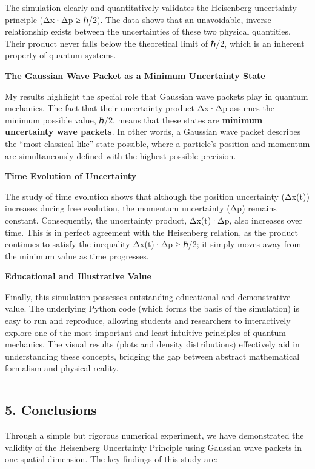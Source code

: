 \documentclass[
  11pt,
]{article}
\begin{document}
The simulation clearly and quantitatively validates the Heisenberg
uncertainty principle (Δx·Δp ≥ ℏ/2). The data shows that an unavoidable,
inverse relationship exists between the uncertainties of these two
physical quantities. Their product never falls below the theoretical
limit of ℏ/2, which is an inherent property of quantum systems.

\textbf{The Gaussian Wave Packet as a Minimum Uncertainty State}

My results highlight the special role that Gaussian wave packets play in
quantum mechanics. The fact that their uncertainty product Δx·Δp assumes
the minimum possible value, ℏ/2, means that these states are
\textbf{minimum uncertainty wave packets}. In other words, a Gaussian
wave packet describes the ``most classical-like'' state possible, where
a particle's position and momentum are simultaneously defined with the
highest possible precision.

\textbf{Time Evolution of Uncertainty}

The study of time evolution shows that although the position uncertainty
(Δx(t)) increases during free evolution, the momentum uncertainty (Δp)
remains constant. Consequently, the uncertainty product, Δx(t)·Δp, also
increases over time. This is in perfect agreement with the Heisenberg
relation, as the product continues to satisfy the inequality Δx(t)·Δp ≥
ℏ/2; it simply moves away from the minimum value as time progresses.

\textbf{Educational and Illustrative Value}

Finally, this simulation possesses outstanding educational and
demonstrative value. The underlying Python code (which forms the basis
of the simulation) is easy to run and reproduce, allowing students and
researchers to interactively explore one of the most important and least
intuitive principles of quantum mechanics. The visual results (plots and
density distributions) effectively aid in understanding these concepts,
bridging the gap between abstract mathematical formalism and physical
reality.

\begin{center}\rule{0.5\linewidth}{0.5pt}\end{center}

\subsection{5. Conclusions}\label{conclusions}

Through a simple but rigorous numerical experiment, we have demonstrated
the validity of the Heisenberg Uncertainty Principle using Gaussian wave
packets in one spatial dimension. The key findings of this study are:
\end{document}
